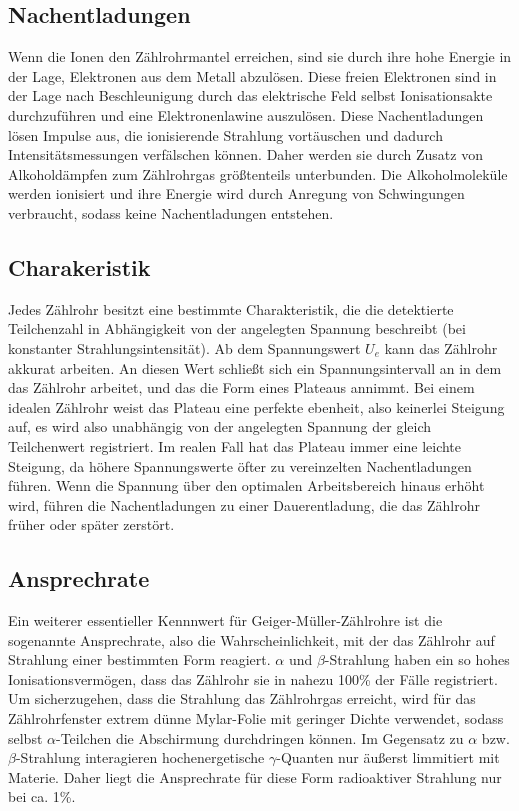 \subsection{Nachentladungen}
Wenn die Ionen den Zählrohrmantel erreichen, sind sie durch ihre hohe Energie in der Lage, Elektronen aus dem Metall abzulösen. Diese freien Elektronen sind in der Lage nach Beschleunigung durch das elektrische Feld selbst Ionisationsakte durchzuführen und eine Elektronenlawine auszulösen. Diese Nachentladungen lösen Impulse aus, die ionisierende Strahlung vortäuschen und dadurch Intensitätsmessungen verfälschen können. Daher werden sie durch Zusatz von Alkoholdämpfen zum Zählrohrgas größtenteils unterbunden. Die Alkoholmoleküle werden ionisiert und ihre Energie wird durch Anregung von Schwingungen verbraucht, sodass keine Nachentladungen entstehen.
\subsection{Charakeristik}
Jedes Zählrohr besitzt eine bestimmte Charakteristik, die die detektierte Teilchenzahl in Abhängigkeit von der angelegten Spannung beschreibt (bei konstanter Strahlungsintensität). Ab dem Spannungswert $U_e$ kann das Zählrohr akkurat arbeiten. An diesen Wert schließt sich ein Spannungsintervall an in dem das Zählrohr arbeitet, und das die Form eines Plateaus annimmt. Bei einem idealen Zählrohr weist das Plateau eine perfekte ebenheit, also keinerlei Steigung auf, es wird also unabhängig von der angelegten Spannung der gleich Teilchenwert registriert. Im realen Fall hat das Plateau immer eine leichte Steigung, da höhere Spannungswerte öfter zu vereinzelten Nachentladungen führen. Wenn die Spannung über den optimalen Arbeitsbereich hinaus erhöht wird, führen die Nachentladungen zu einer Dauerentladung, die das Zählrohr früher oder später zerstört.
\subsection{Ansprechrate}
Ein weiterer essentieller Kennnwert für Geiger-Müller-Zählrohre ist die sogenannte Ansprechrate, also die Wahrscheinlichkeit, mit der das Zählrohr auf Strahlung einer bestimmten Form reagiert. $\alpha$ und $\beta$-Strahlung haben ein so hohes Ionisationsvermögen, dass das Zählrohr sie in nahezu 100\% der Fälle registriert. Um sicherzugehen, dass die Strahlung das Zählrohrgas erreicht, wird für das Zählrohrfenster extrem dünne Mylar-Folie mit geringer Dichte verwendet, sodass selbst $\alpha$-Teilchen die Abschirmung durchdringen können. Im Gegensatz zu $\alpha$ bzw. $\beta$-Strahlung interagieren hochenergetische $\gamma$-Quanten nur äußerst limmitiert mit Materie. Daher liegt die Ansprechrate für diese Form radioaktiver Strahlung nur bei ca. 1\%.

